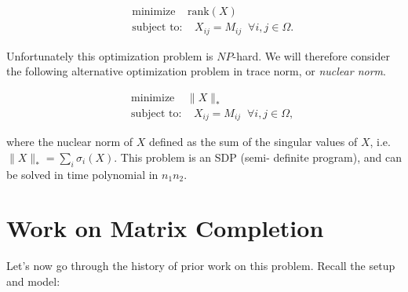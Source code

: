 \documentclass[11pt]{article}
\begin{document}
\begin{eqnarray*}
	&&\mbox{minimize}   \;\;\;\; \mbox{rank}(X) \\ 
	&&\mbox{subject to:} \;\;\;\;  X_{ij} = M_{ij} \;\; \forall i,j \in 
	\Omega.
\end{eqnarray*}

Unfortunately this optimization problem is $NP$-hard. We will therefore 
consider the following alternative optimization problem in trace norm, or
{\em nuclear norm}.

\begin{eqnarray*}
	&&\mbox{minimize}   \;\;\;\; \|X\|_* \\ 
	&&\mbox{subject to:} \;\;\;\;  X_{ij} = M_{ij} \;\; \forall i,j \in 
	\Omega,
\end{eqnarray*}

where the nuclear norm of $X$ defined as the sum of the singular values of $X$, 
i.e. $\|X\|_* = \sum_i \sigma_i(X)$. This problem is an SDP (semi-
definite program), and can be solved in time polynomial in $n_1n_2$.  


\section{Work on Matrix Completion}
Let's now go through the history of prior work on this 
problem. Recall the setup and model:
\end{document}

